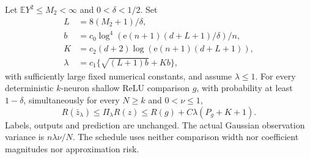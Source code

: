 \begin{theorem}
\label{thm:all-width-relu}
Let $\mathbb EY^2\le M_2<\infty$ and $0<\delta<1/2$. Set
\begin{align*}
 L&=8(M_2+1)/\delta,\\
 b&=c_0\log^4(\mathrm e(n+1)(d+L+1)/\delta)/n,\\
 K&=c_2(d+2)\log(\mathrm e(n+1)(d+L+1)),\\
 \lambda&=c_1\{\sqrt{(L+1)b}+K b\},
\end{align*}
with sufficiently large fixed numerical constants, and assume
$\lambda\le1$. For every deterministic $k$-neuron shallow ReLU
comparison $g$, with probability at least $1-\delta$,
simultaneously for every $N\ge k$ and $0<\nu\le1$,
\[
 R(\bar z_\lambda)\le\Pi_\lambda R(z)
 \le R(g)+C\lambda(P_g+K+1).                            \tag{GA3}
\]
Labels, outputs and prediction are unchanged. The actual Gaussian
observation variance is $n\lambda\nu/N$. The schedule uses neither
comparison width nor coefficient magnitudes nor approximation risk.
\end{theorem}
